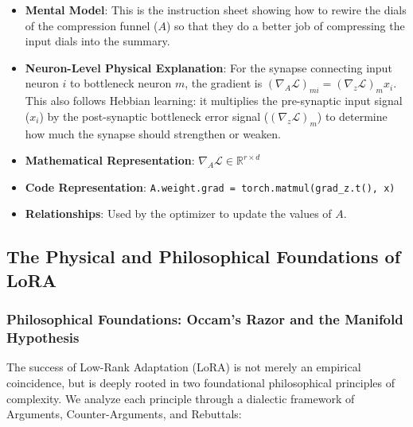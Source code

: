 \begin{enumerate}
\begin{itemize}
\begin{center}
\begin{adjustbox}{max width=0.85\linewidth}
\begin{tikzpicture}[node distance=1.0cm and 1.5cm, scale=0.85, every node/.style={transform shape}]
\end{tikzpicture}
\end{adjustbox}
\vspace{1.5em}
\end{center}

      \item \textbf{Mental Model}: This is the instruction sheet showing how to rewire the dials of the compression funnel ($A$) so that they do a better job of compressing the input dials into the summary.
      \item \textbf{Neuron-Level Physical Explanation}: For the synapse connecting input neuron $i$ to bottleneck neuron $m$, the gradient is $(\nabla_A \mathcal{L})_{mi} = (\nabla_z \mathcal{L})_m x_i$. This also follows Hebbian learning: it multiplies the pre-synaptic input signal ($x_i$) by the post-synaptic bottleneck error signal ($(\nabla_z \mathcal{L})_m$) to determine how much the synapse should strengthen or weaken.
      \item \textbf{Mathematical Representation}: $\nabla_A \mathcal{L} \in \mathbb{R}^{r \times d}$
      \item \textbf{Code Representation}: \texttt{A.weight.grad = torch.matmul(grad\_z.t(), x)}
      \item \textbf{Relationships}: Used by the optimizer to update the values of $A$.
    \end{itemize}
\end{enumerate}

\subsection{The Physical and Philosophical Foundations of LoRA}

\subsubsection{Philosophical Foundations: Occam's Razor and the Manifold Hypothesis}
The success of Low-Rank Adaptation (LoRA) is not merely an empirical coincidence, but is deeply rooted in two foundational philosophical principles of complexity. We analyze each principle through a dialectic framework of Arguments, Counter-Arguments, and Rebuttals:

